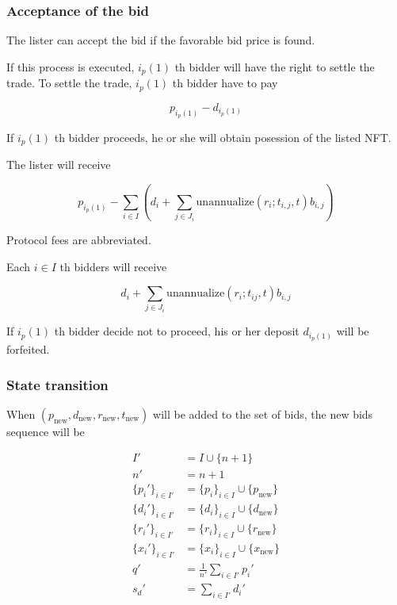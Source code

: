 \documentclass[dvipdfmx]{jsarticle}
\begin{document}
\subsubsection{Acceptance of the bid}

The lister can accept the bid if the favorable bid price is found.

If this process is executed, $i_p(1)$ th bidder will have the right to settle the trade.
To settle the trade, $i_p(1)$ th bidder have to pay

$$
  p_{i_p(1)} - d_{i_p(1)}
$$

If $i_p(1)$ th bidder proceeds, he or she will obtain posession of the listed NFT.

The lister will receive

$$
  p_{i_p(1)} - \sum_{i \in I} \left( d_i + \sum_{j \in J_i} \text{unannualize}(r_i; t_{i,j}, t) b_{i,j} \right)
$$

Protocol fees are abbreviated.

Each $i \in I$ th bidders will receive

$$
  d_i + \sum_{j \in J_i} \text{unannualize}(r_i; t_{ij}, t) b_{i,j}
$$

If $i_p(1)$ th bidder decide not to proceed, his or her deposit $d_{i_p(1)}$ will be forfeited.

\subsubsection{State transition}

When $(p_{\text{new}}, d_{\text{new}}, r_{\text{new}}, t_{\text{new}})$ will be added to the set of bids, the new bids sequence will be

$$
\begin{aligned}
  I' &= I \cup \{n+1\} \\
  n' &= n + 1 \\
  \{p_i'\}_{i \in I'} &= \{p_i\}_{i \in I} \cup \{p_{\text{new}}\} \\
  \{d_i'\}_{i \in I'} &= \{d_i\}_{i \in I} \cup \{d_{\text{new}}\} \\
  \{r_i'\}_{i \in I'} &= \{r_i\}_{i \in I} \cup \{r_{\text{new}}\} \\
  \{x_i'\}_{i \in I'} &= \{x_i\}_{i \in I} \cup \{x_{\text{new}}\} \\
  q' &= \frac{1}{n'} \sum_{i \in I'} p_i' \\
  s_d' &= \sum_{i \in I'} d_i'
\end{aligned}
$$
\end{document}
